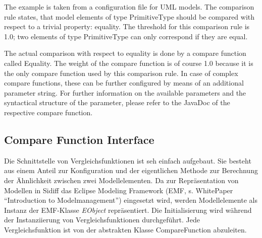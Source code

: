 \documentclass[10pt,a4paper]{scrartcl}
\begin{document}
The example is taken from a configuration file for UML models. The comparison rule states, that 
model elements of type PrimitiveType should be compared with respect to a trivial property: equality.
The threshold for this comparison rule is 1.0; two elements of type PrimitiveType can only correspond
if they are equal.

The actual comparison with respect to equality is done by a compare function called Equality. 
The weight of the compare function is of course 1.0 because it is the only compare function used by
this comparison rule. In case of complex compare functions, these can be further configured by means
of an additional parameter string. For further information on the available parameters and the
syntactical structure of the parameter, please refer to the JavaDoc of the respective compare function.


\subsection{Compare Function Interface}
Die Schnittstelle von Vergleichsfunktionen ist seh einfach aufgebaut. Sie besteht aus einem Anteil zur
Konfiguration und der eigentlichen Methode zur Berechnung der Ähnlichkeit zwischen zwei Modellelementen.
Da zur Repräsentation von Modellen in Sidiff das Eclipse Modeling Framework (EMF, s. WhitePaper ``Introduction to
Modelmanagement'') eingesetzt wird, werden Modellelemente als Instanz der EMF-Klasse \textit{EObject} repräsentiert.
Die Initialisierung wird während der Instanziierung von Vergleichsfunktionen durchgeführt. 
Jede Vergleichsfunktion ist von der abstrakten Klasse CompareFunction abzuleiten.


% 
% 
% 
% 
\end{document}
